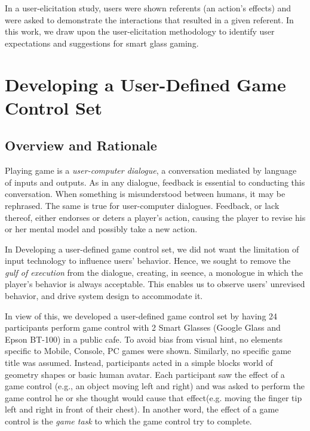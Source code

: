 \documentclass{sigchi}
\begin{document}
    In a user-elicitation study, users were shown referents (an action’s effects) and were asked to demonstrate the interactions that resulted in a given referent\cite{Wobbrock:2009:UGS:1518701.1518866}. In this work, we draw upon the user-elicitation methodology to identify user expectations and suggestions for smart glass gaming.

\section{Developing a User-Defined Game Control Set}


    \subsection {Overview and Rationale}
    Playing game is a \textsl{user-computer dialogue}\cite{userComputer}, a conversation mediated by language of inputs and outputs. As in any dialogue, feedback is essential to conducting this conversation. When something is misunderstood between humans, it may be rephrased. The same is true for user-computer dialogues. Feedback, or lack thereof, either endorses or deters a player's action, causing the player to revise his or her mental model and possibly take a new action.

    In Developing a user-defined game control set, we did not want the limitation of input technology to influence users' behavior. Hence, we sought to remove the \textsl{gulf of execution}\cite{gulf} from the dialogue, creating, in seence, a monologue in which the player's behavior is always acceptable. This enables us to observe users' unrevised behavior, and drive system design to accommodate it.

    In view of this, we developed a user-defined game control set by having 24  participants perform game control with 2 Smart Glasses (Google Glass and Epson BT-100) in a public cafe. To avoid bias from visual hint\cite{Epps:2006:SHS:1125451.1125601}, no elements specific to Mobile, Console, PC games were shown. Similarly, no specific game title was assumed. Instead, participants acted in a simple blocks world of geometry shapes or basic human avatar. Each participant saw the effect of a game control (e.g., an object moving left and right) and was asked to perform the game control he or she thought would cause that effect(e.g. moving the finger tip left and right in front of their chest). In another word, the effect of a game control is the \textsl{game task} to which the game control try to complete.
\end{document}
